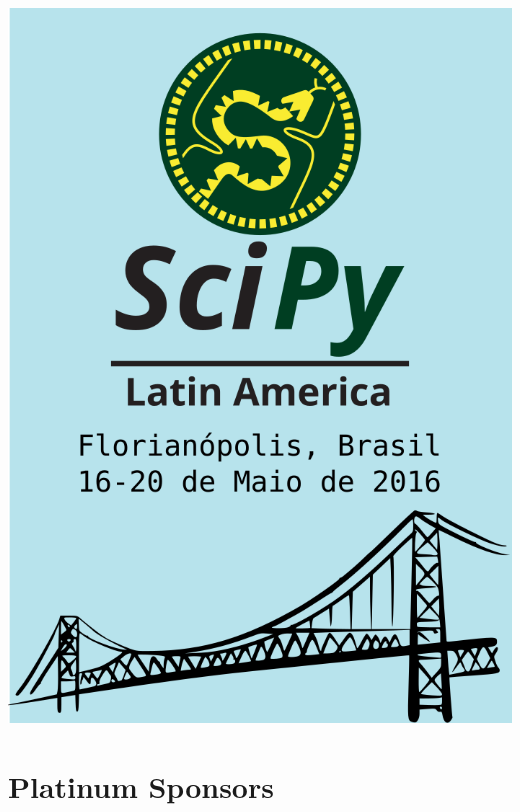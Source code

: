 \documentclass[12pt]{article}
\begin{document}
\thispagestyle{empty}
\noindent  %
\includegraphics{capa}
\NoBgThispage

\clearpage

\restoregeometry

\newpage



\newpage



\newpage

\section*{Platinum Sponsors}
\begin{minipage}{0.4\textwidth}

\end{minipage}
\hfill
\begin{minipage}{0.4\textwidth}

\end{minipage}
\end{document}

